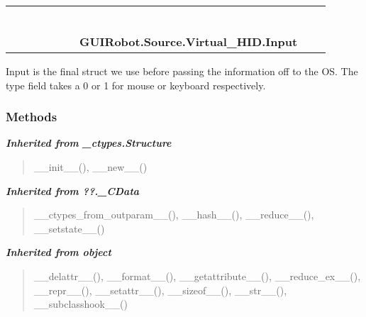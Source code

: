     \label{GUIRobot:Source:Virtual_HID:Input}
\begin{tabular}{cccccccccc}
\multicolumn{2}{r}{\settowidth{\BCL}{object}\multirow{2}{\BCL}{object}}
&&
&&
&&
  \\\cline{3-3}
  &&\multicolumn{1}{c|}{}
&&
&&
&&
  \\
\multicolumn{4}{r}{\settowidth{\BCL}{??.\_CData}\multirow{2}{\BCL}{??.\_CData}}
&&
&&
  \\\cline{5-5}
  &&&&\multicolumn{1}{c|}{}
&&
&&
  \\
\multicolumn{6}{r}{\settowidth{\BCL}{\_ctypes.Structure}\multirow{2}{\BCL}{\_ctypes.Structure}}
&&
  \\\cline{7-7}
  &&&&&&\multicolumn{1}{c|}{}
&&
  \\
&&&&&&\multicolumn{2}{l}{\textbf{GUIRobot.Source.Virtual\_HID.Input}}
\end{tabular}

Input is the final struct we use before passing the information off to the 
OS. The type field takes a 0 or 1 for mouse or keyboard respectively.



  \subsubsection{Methods}


\large{\textbf{\textit{Inherited from \_ctypes.Structure}}}

\begin{quote}
\_\_init\_\_(), \_\_new\_\_()
\end{quote}

\large{\textbf{\textit{Inherited from ??.\_CData}}}

\begin{quote}
\_\_ctypes\_from\_outparam\_\_(), \_\_hash\_\_(), \_\_reduce\_\_(), \_\_setstate\_\_()
\end{quote}

\large{\textbf{\textit{Inherited from object}}}

\begin{quote}
\_\_delattr\_\_(), \_\_format\_\_(), \_\_getattribute\_\_(), \_\_reduce\_ex\_\_(), \_\_repr\_\_(), \_\_setattr\_\_(), \_\_sizeof\_\_(), \_\_str\_\_(), \_\_subclasshook\_\_()
\end{quote}

